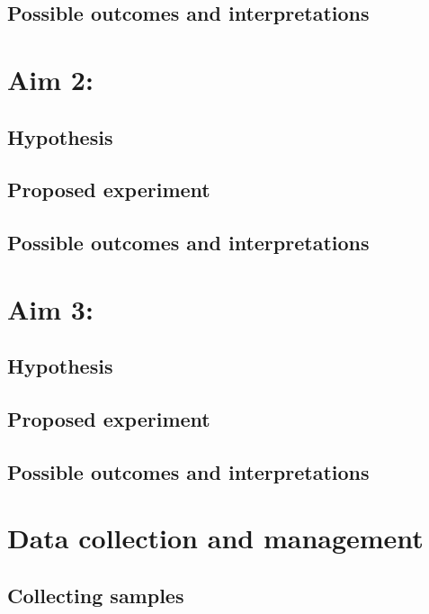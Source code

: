 \documentclass[12pt]{article}
\begin{document}
		\subsection{Possible outcomes and interpretations}		
	
	\section{Aim 2:}
	
		\subsection{Hypothesis}
		
		\subsection{Proposed experiment}
		
		\subsection{Possible outcomes and interpretations}		
		
	\section{Aim 3:}
	
		\subsection{Hypothesis}
		
		\subsection{Proposed experiment}
		
		\subsection{Possible outcomes and interpretations}				
	
	\section{Data collection and management}
		
		\subsection{Collecting samples}
		
\end{document}
